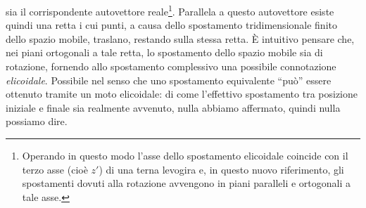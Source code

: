 sia il corrispondente autovettore reale\footnote
{
Operando in questo modo l'asse dello spostamento elicoidale coincide
con il terzo asse (cio\`e $z'$) di una terna levogira e, in questo
nuovo riferimento, gli spostamenti dovuti alla rotazione avvengono
in piani paralleli e ortogonali a tale asse.
}. Parallela a questo autovettore esiste quindi
una retta i cui punti, a causa dello spostamento tridimensionale finito
dello spazio mobile, traslano, restando sulla stessa retta.
\`E intuitivo pensare che, nei piani ortogonali a tale retta,
lo spostamento dello spazio mobile
sia di rotazione, fornendo  allo spostamento complessivo una possibile
connotazione {\em elicoidale}. Possibile nel senso che uno spostamento
equivalente ``pu\`o'' essere ottenuto tramite un moto elicoidale:
di come l'effettivo
spostamento tra posizione iniziale e finale sia realmente avvenuto,
nulla abbiamo affermato, quindi nulla possiamo dire.

